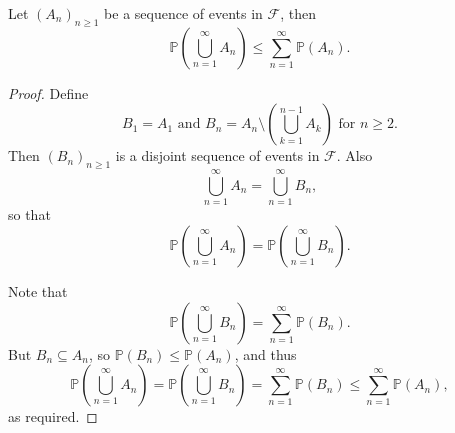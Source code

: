 \begin{proposition}\label{prop:Countable subadditivity}
    Let $ (A_n)_{n\ge 1} $ be a sequence of events in $ \mathcal{F} $, then 
\[
    \mathbb{P}\left( \bigcup_{n=1}^{\infty}A_n \right)\le \sum_{n=1}^{\infty}\mathbb{P}(A_n).
\]
\end{proposition}
\begin{proof}
    Define 
    \[
        B_1=A_1 \text{ and } B_n = A_n \setminus \left( \bigcup_{k=1}^{n-1}A_k \right)\text{ for }n\ge 2.
    \]
    Then $ (B_n)_{n\ge 1} $ is a disjoint sequence of events in $ \mathcal{F} $. Also
    \[
        \bigcup_{n=1}^{\infty}A_n=\bigcup_{n=1}^{\infty}B_n,
    \]
    so that
    \[
        \mathbb{P}\left( \bigcup_{n=1}^{\infty}A_n \right) = \mathbb{P}\left( \bigcup_{n=1}^{\infty}B_n \right).
    \]
    
    Note that 
    \[
        \mathbb{P}\left( \bigcup_{n=1}^{\infty}B_n \right) = \sum_{n=1}^{\infty}\mathbb{P}(B_n).
    \]
    But $ B_n \subseteq A_n $, so $ \mathbb{P}(B_n)\le \mathbb{P}(A_n) $, and thus 
    \[
        \mathbb{P}\left( \bigcup_{n=1}^{\infty}A_n \right) = \mathbb{P}\left( \bigcup_{n=1}^{\infty}B_n \right)=\sum_{n=1}^{\infty}\mathbb{P}(B_n)\le \sum_{n=1}^{\infty}\mathbb{P}(A_n),
    \]
    as required.
\end{proof}